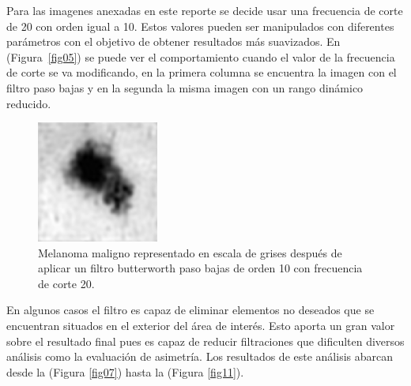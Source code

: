 Para las imagenes anexadas en este reporte se decide usar una frecuencia de corte de 20 con orden igual a 10. Estos valores pueden ser manipulados con diferentes parámetros con el objetivo de obtener resultados más suavizados. En (Figura~\ref{fig05}) se puede ver el comportamiento cuando el valor de la frecuencia de corte se va modificando, en la primera columna se encuentra la imagen con el filtro paso bajas y en la segunda la misma imagen con un rango dinámico reducido.

 \begin{figure}[h] 
	\begin{center} 
		\includegraphics[width=4cm]{images/F06-A.png} 
	\end{center} 
	\vspace{-10pt}
	\caption{\footnotesize Melanoma maligno representado en escala de grises después de aplicar un filtro butterworth paso bajas de orden 10 con frecuencia de corte 20.}  
	\label{fig06} 
\end{figure}


En algunos casos el filtro es capaz de eliminar elementos no deseados que se encuentran situados en el exterior del área de interés. Esto aporta un gran valor sobre el resultado final pues es capaz de reducir filtraciones que dificulten diversos análisis como la evaluación de asimetría. Los resultados de este análisis abarcan desde la (Figura \ref{fig07}) hasta la (Figura \ref{fig11}).



